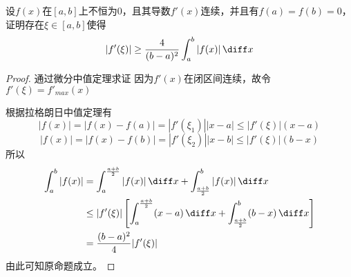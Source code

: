 \begin{example}
    设$f(x)$在$[a,b]$上不恒为$0$，且其导数$f'(x)$连续，并且有$f(a)=f(b)=0$，证明存在$\xi\in[a,b]$使得
    \[ |f'(\xi)| \geq \frac{4}{(b-a)^2} \int_a^b|f(x)|\,\diff x \]
\end{example}
\begin{proof}
    通过微分中值定理求证
    因为$f'(x)$在闭区间连续，故令$f'(\xi) = f'_{max}(x)$

    根据拉格朗日中值定理有
    \[ |f(x)| = |f(x)-f(a)| = |f'(\xi_1)||x-a| \leq |f'(\xi)|(x-a) \]
    \[ |f(x)| = |f(x)-f(b)| = |f'(\xi_2)||x-b| \leq |f'(\xi)|(b-x) \]
    所以
    \begin{align*}
        \int_a^b|f(x)| & = \int_a^{\frac{a+b}{2}} |f(x)|\,\diff x + \int_{\frac{a+b}{2}}^b |f(x)|\,\diff x                          \\
                       & \leq |f'(\xi)|\left[ \int_a^{\frac{a+b}{2}} (x-a)\,\diff x + \int_{\frac{a+b}{2}}^b (b-x)\,\diff x \right] \\
                       & = \frac{(b-a)^2}{4}|f'(\xi)|
    \end{align*}
    由此可知原命题成立。
\end{proof}

